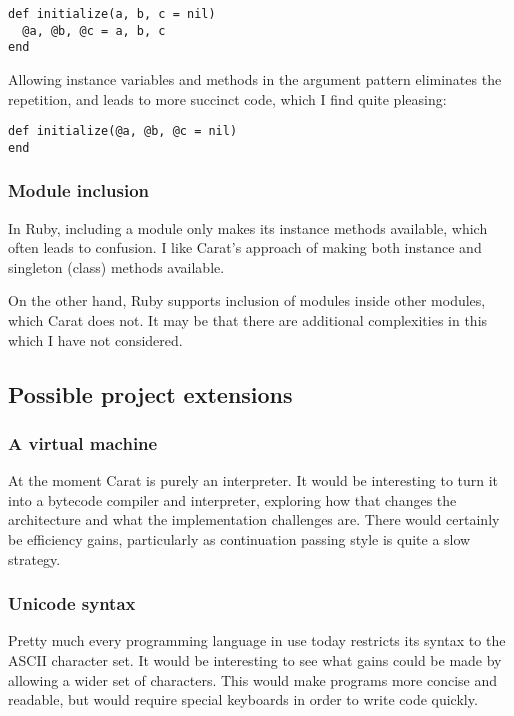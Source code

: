 \begin{lstlisting}
def initialize(a, b, c = nil)
  @a, @b, @c = a, b, c
end
\end{lstlisting}

Allowing instance variables and methods in the argument pattern eliminates the repetition, and leads to more succinct code, which I find quite pleasing:

\begin{lstlisting}
def initialize(@a, @b, @c = nil)
end
\end{lstlisting}

\subsubsection{Module inclusion}

In Ruby, including a module only makes its instance methods available, which often leads to confusion. I like Carat's approach of making both instance and singleton (class) methods available.

On the other hand, Ruby supports inclusion of modules inside other modules, which Carat does not. It may be that there are additional complexities in this which I have not considered.

\subsection{Possible project extensions}

\subsubsection{A virtual machine}

At the moment Carat is purely an interpreter. It would be interesting to turn it into a bytecode compiler and interpreter, exploring how that changes the architecture and what the implementation challenges are. There would certainly be efficiency gains, particularly as continuation passing style is quite a slow strategy.

\subsubsection{Unicode syntax}

Pretty much every programming language in use today restricts its syntax to the ASCII character set. It would be interesting to see what gains could be made by allowing a wider set of characters. This would make programs more concise and readable, but would require special keyboards in order to write code quickly.


